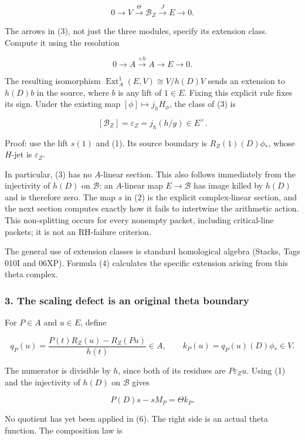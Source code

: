 \[\boxed{0\longrightarrow V\xrightarrow{\Theta}\mathscr B_Z\xrightarrow{J}E\longrightarrow0.}\tag{3}\]

The arrows in (3), not just the three modules, specify its extension class. Compute it using the
resolution

\[0\longrightarrow A\xrightarrow{\times h}A\longrightarrow E\longrightarrow0.\]

The resulting isomorphism \(\operatorname{Ext}^1_A(E,V)\cong V/h(D)V\) sends an extension to
\(h(D)b\) in the source, where \(b\) is any lift of \(1\in E\). Fixing this explicit rule fixes its
sign. Under the existing map \([\phi]\mapsto j_hH_\phi\), the class of (3) is

\[\boxed{[\mathscr B_Z]=\varepsilon_Z=j_h(h/g)\in E^\times.}\tag{4}\]

Proof: use the lift \(s(1)\) and (1). Its source boundary is \(R_Z(1)(D)\phi_*\), whose \(H\)-jet is
\(\varepsilon_Z\).

In particular, (3) has no \(A\)-linear section. This also follows immediately from the injectivity
of \(h(D)\) on \(\mathscr B\): an \(A\)-linear map \(E\to\mathscr B\) has image killed by \(h(D)\)
and is therefore zero. The map \(s\) in (2) is the explicit complex-linear section, and the next
section computes exactly how it fails to intertwine the arithmetic action. This non-splitting occurs
for every nonempty packet, including critical-line packets; it is not an RH-failure criterion.

The general use of extension classes is standard homological algebra (Stacks, Tags 010I and 06XP).
Formula (4) calculates the specific extension arising from this theta complex.

\subsubsection{3. The scaling defect is an original theta
boundary}\label{pr_9:the-scaling-defect-is-an-original-theta-boundary}

For \(P\in A\) and \(u\in E\), define

\[q_P(u)=\frac{P(t)R_Z(u)-R_Z(Pu)}{h(t)}\in A,\qquad
k_P(u)=q_P(u)(D)\phi_*\in V.\tag{5}\]

The numerator is divisible by \(h\), since both of its residues are \(P\varepsilon_Zu\). Using (1)
and the injectivity of \(h(D)\) on \(\mathscr B\) gives

\[\boxed{P(D)s-sM_P=\Theta k_P.}\tag{6}\]

No quotient has yet been applied in (6). The right side is an actual theta function. The composition
law is


